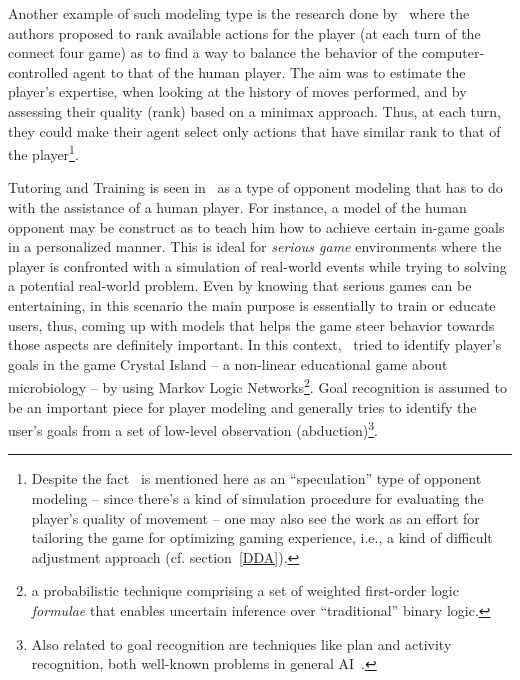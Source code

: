 Another example of such modeling type is the research done by~\cite{missura_online_2008} where the authors proposed to rank available actions for the player (at each turn of the connect four game) as to find a way to balance the behavior of the computer-controlled agent to that of the human player. The aim was to estimate the player's expertise, when looking at the history of moves performed, and by assessing their quality (rank) based on a minimax approach.  Thus, at each turn, they could make their agent select only actions that have similar rank to that of the player\footnote{Despite the fact~\cite{missura_online_2008} is mentioned here as an ``speculation'' type of opponent modeling -- since there's a kind of simulation procedure for evaluating the player's quality of movement -- one may also see the work as an effort for tailoring the game for optimizing gaming experience, i.e., a kind of difficult adjustment approach (cf. section~\ref{DDA}).}.

Tutoring and Training is seen in~\cite{herik_opponent_2005} as a type of opponent modeling that has to do with the assistance of a human player. For instance,  a model of the human opponent may be construct as to teach him how to achieve certain in-game goals in a personalized manner. This is ideal for \textit{serious game} environments where the player is confronted with a simulation of real-world events while trying to solving a potential real-world problem. Even by knowing that serious games can be entertaining, in this scenario the main purpose is essentially to train or educate users, thus, coming up with models that helps the game steer behavior towards those aspects are definitely important. In this context,~\cite{ha_goal_2011} tried to identify player's goals in the game Crystal Island -- a non-linear educational game about microbiology -- by using Markov Logic Networks\footnote{a probabilistic technique comprising a set of weighted first-order logic \textit{formulae} that enables uncertain inference over ``traditional'' binary logic. }. Goal recognition is assumed to be an important piece for player modeling and generally tries to identify the user's goals from a set of low-level observation (abduction)\footnote{Also related to goal recognition are techniques like plan and activity recognition, both well-known problems in general AI~\cite{ha_goal_2011}.}. 

